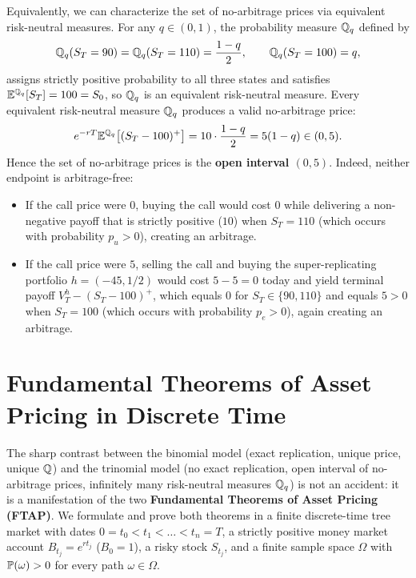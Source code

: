 Equivalently, we can characterize the set of no-arbitrage prices via equivalent risk-neutral measures. For any $q \in (0, 1)$, the probability measure $\mathbb{Q}_q$ defined by
\[
    \mathbb{Q}_q(S_T = 90) = \mathbb{Q}_q(S_T = 110) = \frac{1 - q}{2}, \qquad \mathbb{Q}_q(S_T = 100) = q,
\]
assigns strictly positive probability to all three states and satisfies $\mathbb{E}^{\mathbb{Q}_q}[S_T] = 100 = S_0$, so $\mathbb{Q}_q$ is an equivalent risk-neutral measure. Every equivalent risk-neutral measure $\mathbb{Q}_q$ produces a valid no-arbitrage price:
\[
    e^{-rT} \mathbb{E}^{\mathbb{Q}_q}\bigl[(S_T - 100)^+\bigr] = 10 \cdot \frac{1 - q}{2} = 5(1 - q) \in (0, 5).
\]
Hence the set of no-arbitrage prices is the \textbf{open interval $(0, 5)$}. Indeed, neither endpoint is arbitrage-free:
\begin{itemize}
    \item If the call price were $0$, buying the call would cost $0$ while delivering a non-negative payoff that is strictly positive ($10$) when $S_T = 110$ (which occurs with probability $p_u > 0$), creating an arbitrage.
    \item If the call price were $5$, selling the call and buying the super-replicating portfolio $h = (-45, 1/2)$ would cost $5 - 5 = 0$ today and yield terminal payoff $V_T^h - (S_T - 100)^+$, which equals $0$ for $S_T \in \{90, 110\}$ and equals $5 > 0$ when $S_T = 100$ (which occurs with probability $p_e > 0$), again creating an arbitrage.
\end{itemize}

\section{Fundamental Theorems of Asset Pricing in Discrete Time}

The sharp contrast between the binomial model (exact replication, unique price, unique $\mathbb{Q}$) and the trinomial model (no exact replication, open interval of no-arbitrage prices, infinitely many risk-neutral measures $\mathbb{Q}_q$) is not an accident: it is a manifestation of the two \textbf{Fundamental Theorems of Asset Pricing (FTAP)}. We formulate and prove both theorems in a finite discrete-time tree market with dates $0 = t_0 < t_1 < \dots < t_n = T$, a strictly positive money market account $B_{t_j} = e^{r t_j}$ ($B_0 = 1$), a risky stock $S_{t_j}$, and a finite sample space $\Omega$ with $\mathbb{P}(\omega) > 0$ for every path $\omega \in \Omega$.

